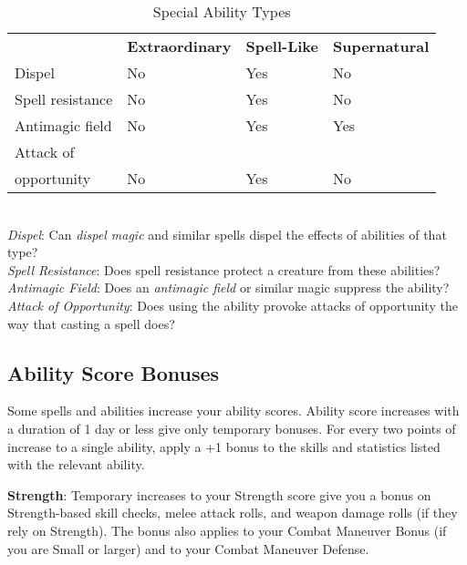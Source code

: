 \begin{table}[]
\sffamily
\caption{Special Ability Types}
\begin{tabular}{llll}
\textbf{}             & \textbf{Extraordinary} & \textbf{Spell-Like} & \textbf{Supernatural} \\
Dispel                & No                     & Yes                 & No                    \\
Spell resistance      & No                     & Yes                 & No                    \\
Antimagic field       & No                     & Yes                 & Yes                   \\
Attack of             &                        &                     &     \\
opportunity & No                     & Yes                 & No    \\                
\end{tabular}\\
\textit{Dispel}: Can \textit{dispel magic }and similar spells dispel the effects of abilities of that type?\\
\textit{Spell Resistance}: Does spell resistance protect a creature from these abilities?\\
\textit{Antimagic Field}: Does an \textit{antimagic field }or similar magic suppress the ability?\\
\textit{Attack of Opportunity}: Does using the ability provoke attacks of opportunity the way that casting a spell does?\\
\end{table}
						
\subsection{Ability Score Bonuses}

				
Some spells and abilities increase your ability scores. Ability score increases with a duration of 1 day or less give only temporary bonuses. For every two points of increase to a single ability, apply a +1 bonus to the skills and statistics listed with the relevant ability.
				
\textbf{Strength}: Temporary increases to your Strength score give you a bonus on Strength-based skill checks, melee attack rolls, and weapon damage rolls (if they rely on Strength). The bonus also applies to your Combat Maneuver Bonus (if you are Small or larger) and to your Combat Maneuver Defense.
				
